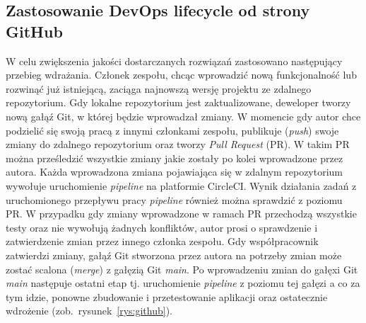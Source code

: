 	\subsection{Zastosowanie DevOps lifecycle od strony GitHub}
	W celu zwiększenia jakości dostarczanych rozwiązań zastosowano następujący przebieg wdrażania. Członek zespołu, chcąc wprowadzić nową funkcjonalność lub rozwinąć już istniejącą, zaciąga najnowszą wersję projektu ze zdalnego repozytorium. Gdy lokalne repozytorium jest zaktualizowane, deweloper tworzy nową gałąź Git, w której będzie wprowadzał zmiany. W momencie gdy autor chce podzielić się swoją pracą z innymi członkami zespołu, publikuje (\textit{push}) swoje zmiany do zdalnego repozytorium oraz tworzy \textit{Pull Request} (PR). W takim PR można prześledzić wszystkie zmiany jakie zostały po kolei wprowadzone przez autora. Każda wprowadzona zmiana pojawiająca się w zdalnym repozytorium wywołuje uruchomienie \textit{pipeline} na platformie CircleCI. Wynik działania zadań z uruchomionego przepływu pracy \textit{pipeline} również można sprawdzić z poziomu PR. W przypadku gdy zmiany wprowadzone w ramach PR przechodzą wszystkie testy oraz nie wywołują żadnych konfliktów, autor prosi o sprawdzenie i zatwierdzenie zmian przez innego członka zespołu. Gdy współpracownik zatwierdzi zmiany, gałąź Git stworzona przez autora na potrzeby zmian może zostać scalona (\textit{merge}) z gałęzią Git \textit{main}. Po wprowadzeniu zmian do gałęxi Git \textit{main} następuje ostatni etap tj. uruchomienie \textit{pipeline} z poziomu tej gałęzi a co za tym idzie, ponowne zbudowanie i przetestowanie aplikacji oraz ostatecznie wdrożenie (zob.~rysunek~\ref{rys:github}).
